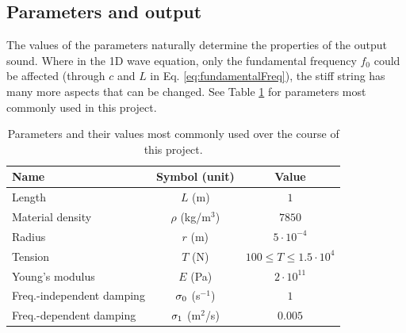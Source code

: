 \subsection{Parameters and output}\label{sec:paramsAndOutput}
The values of the parameters naturally determine the properties of the output sound. Where in the 1D wave equation, only the fundamental frequency $f_0$ could be affected (through $c$ and $L$ in Eq. \eqref{eq:fundamentalFreq}), the stiff string has many more aspects that can be changed. See Table \ref{tab:stiffStringParams} for parameters most commonly used in this project. 
\begin{table}[h]
    \begin{center}
    \begin{tabular}{|l|c|c|}
        \hline
        Name & Symbol (unit) & Value\\ \hline
        Length & $L$ (m) & $1$\\
        Material density & $\rho$ (kg/m$^3$) & $7850$\\
        Radius & $r$ (m) & $5\cdot10^{-4}$\\
        Tension & $T$ (N) &$100 \leq T \leq 1.5\cdot 10^4$\\
        Young's modulus & $E$ (Pa) & $2\cdot10^{11}$\\
        Freq.-independent damping & $\sigma_{0}$ (s$^{-1}$) & $1$\\
        Freq.-dependent damping & $\sigma_{1}$ (m$^2$/s) & $0.005$\\\hline
    \end{tabular}
    \caption{Parameters and their values most commonly used over the course of this project.\label{tab:stiffStringParams}}
    \end{center}
\end{table}
